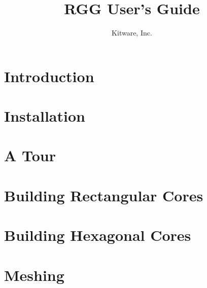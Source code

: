 \documentclass[letterpaper,10pt,draft]{book}
\title{RGG User's Guide}
\author{Kitware, Inc.}
\begin{document}
\maketitle
\tableofcontents

\chapter{Introduction}
\label{chapter:Introduction}


\chapter{Installation}
\label{Installation}



\chapter{A Tour}
\label{chapter:ATour}



\chapter{Building Rectangular Cores}
\label{chapter:ExampleBuildingARectangularCore}


\chapter{Building Hexagonal Cores}
\label{chapter:ExampleBuildingAHexagonalCore}


\chapter{Meshing}
\label{chapter:Meshing}





%

\end{document}
